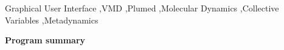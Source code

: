 \documentclass[preprint,12pt]{elsarticle}
\newcommand{\mykeywords}{Graphical User Interface \sep VMD \sep Plumed \sep Molecular Dynamics \sep Collective Variables \sep Metadynamics}
\begin{document}
\begin{frontmatter}



\begin{keyword}
\mykeywords
\end{keyword}

\end{frontmatter}



{\bf Program summary}
\end{document}
